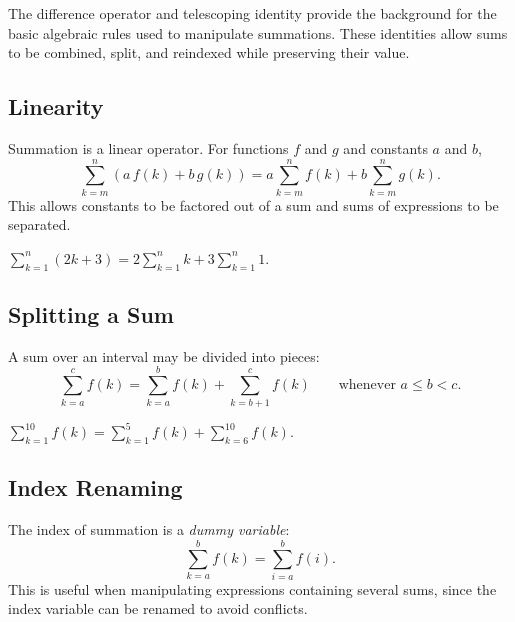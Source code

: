 
\begin{remark*}[Orientation]
The difference operator and telescoping identity provide the background for
the basic algebraic rules used to manipulate summations.
These identities allow sums to be combined, split, and reindexed while
preserving their value.
\end{remark*}

\subsection*{Linearity}

\begin{remark*}[Interpretation]
Summation is a linear operator. For functions \(f\) and \(g\) and
constants \(a\) and \(b\),
\[
\sum_{k=m}^{n} (a\,f(k) + b\,g(k))
=
a \sum_{k=m}^{n} f(k)
+
b \sum_{k=m}^{n} g(k).
\]
This allows constants to be factored out of a sum and sums of expressions
to be separated.
\end{remark*}

\begin{example*}
\(\displaystyle\sum_{k=1}^{n} (2k + 3)
= 2\sum_{k=1}^{n} k + 3\sum_{k=1}^{n} 1.\)
\end{example*}

\subsection*{Splitting a Sum}

\begin{remark*}[Interpretation]
A sum over an interval may be divided into pieces:
\[
\sum_{k=a}^{c} f(k)
=
\sum_{k=a}^{b} f(k)
+
\sum_{k=b+1}^{c} f(k)
\qquad \text{whenever } a \le b < c.
\]
\end{remark*}

\begin{example*}
\(\displaystyle\sum_{k=1}^{10} f(k)
= \sum_{k=1}^{5} f(k) + \sum_{k=6}^{10} f(k).\)
\end{example*}

\subsection*{Index Renaming}

\begin{remark*}[Interpretation]
The index of summation is a \emph{dummy variable}:
\[
\sum_{k=a}^{b} f(k)
=
\sum_{i=a}^{b} f(i).
\]
This is useful when manipulating expressions containing several sums,
since the index variable can be renamed to avoid conflicts.
\end{remark*}

